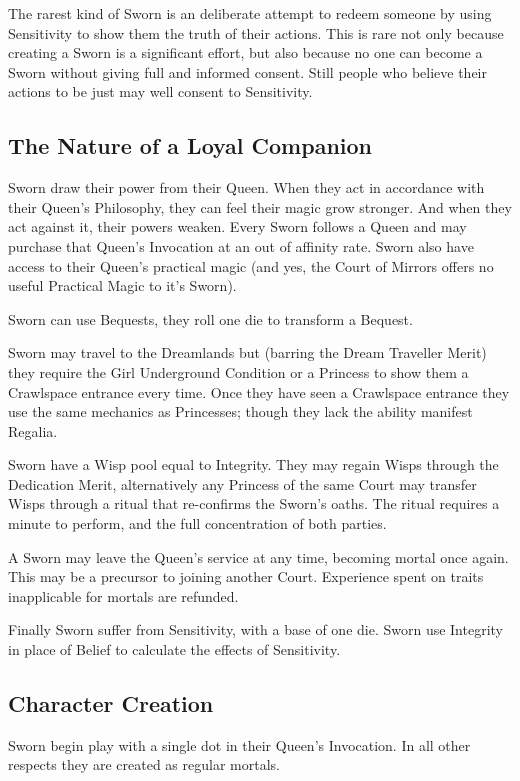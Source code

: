 The rarest kind of Sworn is an deliberate attempt to redeem someone by using Sensitivity to show them  the truth of their actions. This is rare not only because creating a Sworn is a significant effort, but also because no one can become a Sworn without giving full and informed consent. Still people who believe their actions to be just may well consent to Sensitivity.

\subsection*{The Nature of a Loyal Companion}

Sworn draw their power from their Queen. When they act in accordance with their Queen's Philosophy, they can feel their magic grow stronger. And when they act against it, their powers weaken. Every Sworn follows a Queen and may purchase that Queen's Invocation at an out of affinity rate. Sworn also have access to their Queen's practical magic (and yes, the Court of Mirrors offers no useful Practical Magic to it's Sworn).

Sworn can use Bequests, they roll one die to transform a Bequest.

Sworn may travel to the Dreamlands but (barring the Dream Traveller Merit) they require the Girl Underground Condition or a Princess to show them a Crawlspace entrance every time. Once they have seen a Crawlspace entrance they use the same mechanics as Princesses; though they lack the ability manifest Regalia. 

Sworn have a Wisp pool equal to Integrity. They may regain Wisps through the Dedication Merit, alternatively any Princess of the same Court may transfer Wisps through a ritual that re-confirms the Sworn's oaths. The ritual requires a minute to perform, and the full concentration of both parties.

A Sworn may leave the Queen's service at any time, becoming mortal once again. This may be a precursor to joining another Court. Experience spent on traits inapplicable for mortals are refunded.

Finally Sworn suffer from Sensitivity, with a base of one die. Sworn use Integrity in place of Belief to calculate the effects of Sensitivity.

\subsection*{Character Creation}

Sworn begin play with a single dot in their Queen's Invocation. In all other respects they are created as regular mortals. 

